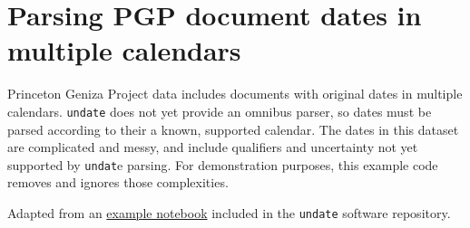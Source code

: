 \documentclass{anthology-ch}         %
\begin{document}
\printbibliography

\appendix

\section{Parsing PGP document dates in multiple calendars} \label{appdx:parse-pgp-dates}

Princeton Geniza Project data includes documents with original dates in multiple calendars.  \texttt{undate} does not yet provide an omnibus parser, so dates must be parsed according to their a known, supported calendar.  The dates in this dataset are complicated and messy, and include qualifiers and uncertainty not yet supported by \texttt{undat}e parsing. For demonstration purposes, this example code removes and ignores those complexities.

Adapted from an \href{https://github.com/dh-tech/undate-python/blob/main/examples/pgp_dates.ipynb}{example notebook} included in the \texttt{undate} software repository.
\end{document}

